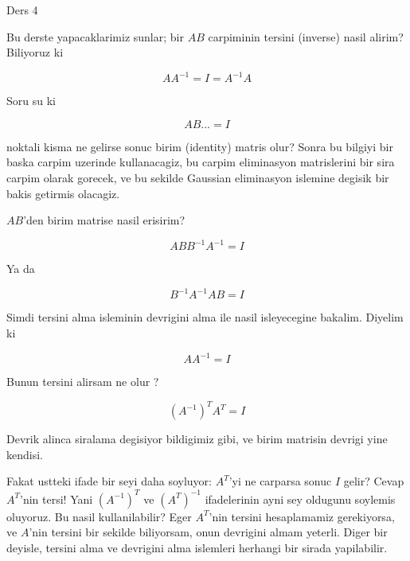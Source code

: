 \documentclass[12pt,fleqn]{article}\usepackage{../common}
\begin{document}
Ders 4

Bu derste yapacaklarimiz sunlar; bir $AB$ carpiminin tersini (inverse)
nasil alirim? Biliyoruz ki 

\[ AA ^{-1}  = I = A ^{-1} A \]

Soru su ki 

\[ AB... = I \]

noktali kisma ne gelirse sonuc birim (identity) matris olur? Sonra bu
bilgiyi bir baska carpim uzerinde kullanacagiz, bu carpim eliminasyon
matrislerini bir sira carpim olarak gorecek, ve bu sekilde Gaussian
eliminasyon islemine degisik bir bakis getirmis olacagiz. 

$AB$'den birim matrise nasil erisirim? 

\[ ABB ^{-1} A ^{-1} = I \]

Ya da

\[ B ^{-1}A ^{-1} AB  = I\]

Simdi tersini alma isleminin devrigini alma ile nasil isleyecegine
bakalim. Diyelim ki 

\[ AA ^{-1} = I \]

Bunun tersini alirsam ne olur ?

\[ (A ^{-1})^T A^T = I \]

Devrik alinca siralama degisiyor bildigimiz gibi, ve birim matrisin devrigi
yine kendisi. 

Fakat ustteki ifade bir seyi daha soyluyor: $A^T$'yi ne carparsa sonuc $I$
gelir? Cevap $A^T$'nin tersi! Yani $(A ^{-1})^T$ ve  $(A^T) ^{-1}$
ifadelerinin ayni sey oldugunu soylemis oluyoruz. Bu nasil kullanilabilir?
Eger $A^T$'nin tersini hesaplamamiz gerekiyorsa, ve $A$'nin tersini bir
sekilde biliyorsam, onun devrigini almam yeterli. Diger bir deyisle,
tersini alma ve devrigini alma islemleri herhangi bir sirada yapilabilir. 
\end{document}
